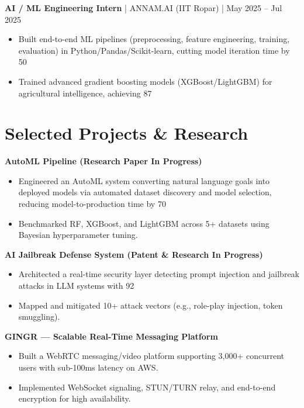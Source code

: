 \documentclass[10pt, letterpaper]{article}
\begin{document}
\textbf{AI / ML Engineering Intern} | ANNAM.AI (IIT Ropar) | May 2025 – Jul 2025
\begin{itemize}[leftmargin=*, itemsep=2pt, parsep=0pt]
    \item Built end-to-end ML pipelines (preprocessing, feature engineering, training, evaluation) in Python/Pandas/Scikit-learn, cutting model iteration time by 50%
    \item Trained advanced gradient boosting models (XGBoost/LightGBM) for agricultural intelligence, achieving 87%
\end{itemize}

\section*{Selected Projects & Research}
\textbf{AutoML Pipeline (Research Paper In Progress)}
\begin{itemize}[leftmargin=*, itemsep=1pt, parsep=0pt]
    \item Engineered an AutoML system converting natural language goals into deployed models via automated dataset discovery and model selection, reducing model-to-production time by 70%
    \item Benchmarked RF, XGBoost, and LightGBM across 5+ datasets using Bayesian hyperparameter tuning.
\end{itemize}

\textbf{AI Jailbreak Defense System (Patent & Research In Progress)}
\begin{itemize}[leftmargin=*, itemsep=1pt, parsep=0pt]
    \item Architected a real-time security layer detecting prompt injection and jailbreak attacks in LLM systems with 92%
    \item Mapped and mitigated 10+ attack vectors (e.g., role-play injection, token smuggling).
\end{itemize}

\textbf{GINGR — Scalable Real-Time Messaging Platform}
\begin{itemize}[leftmargin=*, itemsep=1pt, parsep=0pt]
    \item Built a WebRTC messaging/video platform supporting 3,000+ concurrent users with sub-100ms latency on AWS.
    \item Implemented WebSocket signaling, STUN/TURN relay, and end-to-end encryption for high availability.
\end{itemize}
\end{document}
